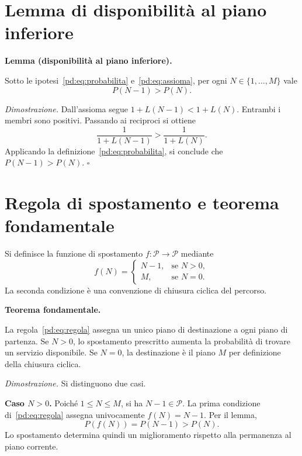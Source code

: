 \section{Lemma di disponibilità al piano inferiore}
\par\medskip\noindent\textbf{Lemma (disponibilità al piano inferiore).}\ \itshape

Sotto le ipotesi~\eqref{pd:eq:probabilita} e~\eqref{pd:eq:assioma}, per ogni $N\in\{1,\ldots,M\}$ vale
\[
\boxed{P(N-1)>P(N).}
\]
\par\normalfont\medskip
\par\noindent\textit{Dimostrazione.} 
Dall'assioma segue $1+L(N-1)<1+L(N)$. Entrambi i membri sono positivi. Passando ai reciproci si ottiene
\[
\frac{1}{1+L(N-1)}>\frac{1}{1+L(N)}.
\]
Applicando la definizione~\eqref{pd:eq:probabilita}, si conclude che $P(N-1)>P(N)$.
\hfill$\square$\par\medskip

\section{Regola di spostamento e teorema fondamentale}
Si definisce la funzione di spostamento $f\colon\mathcal{P}\to\mathcal{P}$ mediante
\begin{equation}\label{pd:eq:regola}
\boxed{
f(N)=
\begin{cases}
N-1, & \text{se }N>0,\\[4pt]
M, & \text{se }N=0.
\end{cases}}
\end{equation}
La seconda condizione è una convenzione di chiusura ciclica del percorso.

\par\medskip\noindent\textbf{Teorema fondamentale.}\ \itshape

La regola~\eqref{pd:eq:regola} assegna un unico piano di destinazione a ogni piano di partenza. Se $N>0$, lo spostamento prescritto aumenta la probabilità di trovare un servizio disponibile. Se $N=0$, la destinazione è il piano $M$ per definizione della chiusura ciclica.
\par\normalfont\medskip
\par\noindent\textit{Dimostrazione.} 
Si distinguono due casi.

\medskip
\noindent\textbf{Caso $N>0$.} Poiché $1\leq N\leq M$, si ha $N-1\in\mathcal{P}$. La prima condizione di~\eqref{pd:eq:regola} assegna univocamente $f(N)=N-1$. Per il lemma,
\[
P(f(N))=P(N-1)>P(N).
\]
Lo spostamento determina quindi un miglioramento rispetto alla permanenza al piano corrente.


